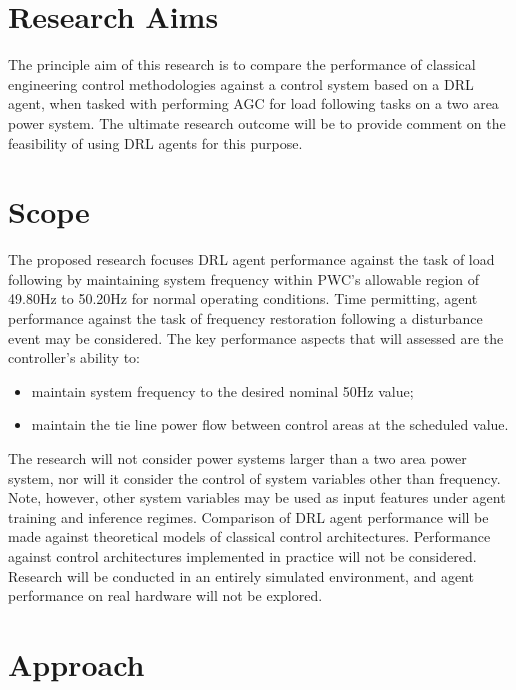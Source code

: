 \documentclass[12pt, a4paper]{article}
\begin{document}
\section{Research Aims}
The principle aim of this research is to compare the performance of classical engineering control methodologies against a control system based on a DRL agent, when tasked with performing AGC for load following tasks on a two area power system. The ultimate research outcome will be to provide comment on the feasibility of using DRL agents for this purpose.

\section{Scope}
The proposed research focuses DRL agent performance against the task of load following by maintaining system frequency within PWC's allowable region of 49.80$\si{\hertz}$ to 50.20$\si{\hertz}$ for normal operating conditions. Time permitting, agent performance against the task of frequency restoration following a disturbance event may be considered. The key performance aspects that will assessed are the controller's ability to:
\begin{itemize}
	\item maintain system frequency to the desired nominal 50$\si{\hertz}$ value;
	\item maintain the tie line power flow between control areas at the scheduled value.
\end{itemize}

The research will not consider power systems larger than a two area power system, nor will it consider the control of system variables other than frequency. Note, however, other system variables may be used as input features under agent training and inference regimes. Comparison of DRL agent performance will be made against theoretical models of classical control architectures. Performance against control architectures implemented in practice will not be considered. Research will be conducted in an entirely simulated environment, and agent performance on real hardware will not be explored.


\section{Approach}
\end{document}
